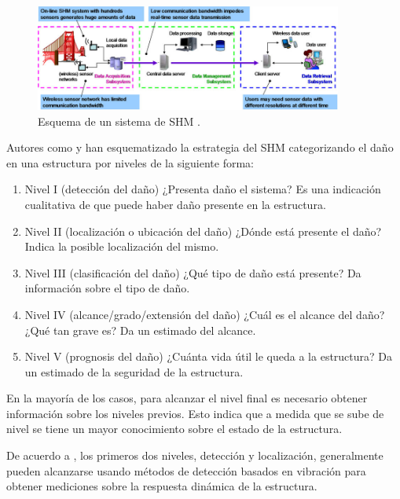 \begin{figure}[H]
    \centering
    \includegraphics[width = 0.9\textwidth]{imagenes/cap1_marcoteo/Schematics-of-an-on-line-structural-health-monitoring-system-and-technical-challenges.png}
    \caption{Esquema de un sistema de SHM \citep{lijianfoto2015}.}
    \label{fig:esquema_gral_SHM}
\end{figure}


Autores como \citet{rytter1993vibration} y \citet{farrar2007introduction} han esquematizado la estrategia del SHM categorizando el daño en una estructura por niveles de la siguiente forma:

\begin{enumerate}
    \item Nivel I (detección del daño) ¿Presenta daño el sistema? Es una indicación cualitativa de que puede haber daño presente en la estructura.
    \item Nivel II (localización o ubicación del daño) ¿Dónde está presente el daño? Indica la posible localización del mismo. 
    \item Nivel III (clasificación del daño) ¿Qué tipo de daño está presente? Da información sobre el tipo de daño.
    \item Nivel IV (alcance/grado/extensión del daño) ¿Cuál es el alcance del daño? ¿Qué tan grave es? Da un estimado del alcance.
    \item Nivel V (prognosis del daño) ¿Cuánta vida útil le queda a la estructura? Da un estimado de la seguridad de la estructura.
\end{enumerate}

En la mayoría de los casos, para alcanzar el nivel final es necesario obtener información sobre los niveles previos. Esto indica que a medida que se sube de nivel se tiene un mayor conocimiento sobre el estado de la estructura.

De acuerdo a \citet{chen2018}, los primeros dos niveles, detección y localización, generalmente pueden alcanzarse usando métodos de detección basados en vibración para obtener mediciones sobre la respuesta dinámica de la estructura.

